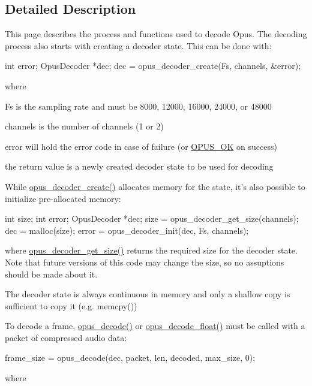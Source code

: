 \subsection{Detailed Description}
This page describes the process and functions used to decode Opus. The decoding process also starts with creating a decoder state. This can be done with: 
\begin{DoxyCode}
 int          error;
 OpusDecoder *dec;
 dec = opus_decoder_create(Fs, channels, &error);
\end{DoxyCode}
 where \begin{DoxyItemize}
\item Fs is the sampling rate and must be 8000, 12000, 16000, 24000, or 48000 \item channels is the number of channels (1 or 2) \item error will hold the error code in case of failure (or \hyperlink{group__opus__errorcodes_gaa44cf8a185e1b5cb940ef63eb4f02d21}{OPUS\_\-OK} on success) \item the return value is a newly created decoder state to be used for decoding\end{DoxyItemize}
While \hyperlink{group__opus__decoder_ga753f6fe0b699c81cfd47d70c8e15a0bd}{opus\_\-decoder\_\-create()} allocates memory for the state, it's also possible to initialize pre-\/allocated memory: 
\begin{DoxyCode}
 int          size;
 int          error;
 OpusDecoder *dec;
 size = opus_decoder_get_size(channels);
 dec = malloc(size);
 error = opus_decoder_init(dec, Fs, channels);
\end{DoxyCode}
 where \hyperlink{group__opus__decoder_gac918415b2ee21add75b7f867ce235011}{opus\_\-decoder\_\-get\_\-size()} returns the required size for the decoder state. Note that future versions of this code may change the size, so no assuptions should be made about it.

The decoder state is always continuous in memory and only a shallow copy is sufficient to copy it (e.g. memcpy())

To decode a frame, \hyperlink{group__opus__decoder_ga7d1111f64c36027ddcb81799df9b3fc9}{opus\_\-decode()} or \hyperlink{group__opus__decoder_ga9c554b8c0214e24733a299fe53bb3bd2}{opus\_\-decode\_\-float()} must be called with a packet of compressed audio data: 
\begin{DoxyCode}
 frame_size = opus_decode(dec, packet, len, decoded, max_size, 0);
\end{DoxyCode}
 where

